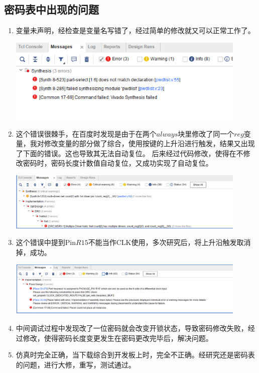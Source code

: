 \documentclass[a4paper,11pt]{ctexart}
\begin{document}
\subsection{密码表中出现的问题}
\begin{enumerate}
  \item 变量未声明，经检查是变量名写错了，经过简单的修改就又可以正常工作了。

        \includegraphics[width=0.9\textwidth]{./images/error0.eps}
  \item 这个错误很棘手，在百度时发现是由于在两个$always$块里修改了同一个$reg$变量，我对修改变量的部分做了综合，使用按键的上升沿进行触发，结果又出现了下面的错误。这也导致其无法自动复位。
        后来经过代码修改，使得在不修改密码时，密码长度计数值自动复位，又成功实现了自动复位。

        \includegraphics[width=0.9\textwidth]{./images/error4.eps}
  \item 这个错误中提到Pin$R15$不能当作CLK使用，多次研究后，将上升沿触发取消掉，成功。

        \includegraphics[width=0.9\textwidth]{./images/error5.eps}

  \item 中间调试过程中发现改了一位密码就会改变开锁状态，导致密码修改失败，经过修改，使得密码长度变更发生在密码更改完毕后，解决问题。

  \item 仿真时完全正确，当下载综合到开发板上时，完全不正确。经研究还是密码表的问题，进行大修，重写，测试通过。
\end{enumerate}
\end{document}
